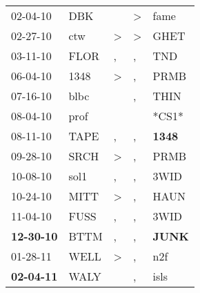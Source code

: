 \begin{supertabular}{p{0.07\textwidth}p{0.06\textwidth}p{0.02\textwidth}p{0.02\textwidth}p{0.06\textwidth}}
          02-04-10\textsuperscript{} &            DBK\textsuperscript{} &                  &     \textgreater &           fame\textsuperscript{} \\
          02-27-10\textsuperscript{} &            ctw\textsuperscript{} &     \textgreater &     \textgreater &           GHET\textsuperscript{} \\
          03-11-10\textsuperscript{} &           FLOR\textsuperscript{} &                , &                , &            TND\textsuperscript{} \\
          06-04-10\textsuperscript{} &           1348\textsuperscript{} &     \textgreater &                , &           PRMB\textsuperscript{} \\
          07-16-10\textsuperscript{} &           blbc\textsuperscript{} &                  &                , &           THIN\textsuperscript{} \\
          08-04-10\textsuperscript{} &           prof\textsuperscript{} &                  &                  &                            *CS1* \\
          08-11-10\textsuperscript{} &           TAPE\textsuperscript{} &                , &                , &  \textbf{1348\textsuperscript{}} \\
          09-28-10\textsuperscript{} &           SRCH\textsuperscript{} &     \textgreater &                , &           PRMB\textsuperscript{} \\
          10-08-10\textsuperscript{} &           sol1\textsuperscript{} &                , &                , &           3WID\textsuperscript{} \\
          10-24-10\textsuperscript{} &           MITT\textsuperscript{} &     \textgreater &                , &           HAUN\textsuperscript{} \\
          11-04-10\textsuperscript{} &           FUSS\textsuperscript{} &                , &                , &           3WID\textsuperscript{} \\
 \textbf{12-30-10\textsuperscript{}} &           BTTM\textsuperscript{} &                , &                , &  \textbf{JUNK\textsuperscript{}} \\
          01-28-11\textsuperscript{} &           WELL\textsuperscript{} &     \textgreater &                , &            n2f\textsuperscript{} \\
 \textbf{02-04-11\textsuperscript{}} &           WALY\textsuperscript{} &                  &                , &           isls\textsuperscript{} \\

\end{supertabular}
